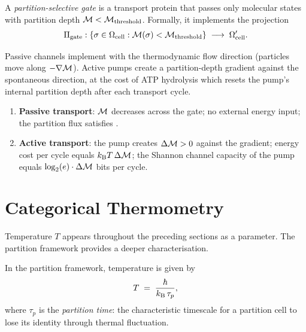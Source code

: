 \begin{definition}
\label{def:gate}
A \emph{partition-selective gate} is a transport protein that passes only
molecular states with partition depth $\mathcal{M} < \mathcal{M}_\mathrm{threshold}$.
Formally, it implements the projection
\[
    \Pi_\mathrm{gate}: \{\sigma \in \Omega_\mathrm{cell} : \mathcal{M}(\sigma) < \mathcal{M}_\mathrm{threshold}\}
    \;\longrightarrow\; \Omega_\mathrm{cell}'.
\]
\end{definition}

Passive channels implement  with the thermodynamic flow direction
(particles move along $-\nabla\mathcal{M}$).  Active pumps create a partition-depth
gradient against the spontaneous direction, at the cost of ATP hydrolysis which
resets the pump's internal partition depth after each transport cycle.

\begin{proposition}
\label{prop:transport-types}
\begin{enumerate}[label=(\roman*)]
    \item \textbf{Passive transport}: $\mathcal{M}$ decreases across the gate; no
          external energy input; the partition flux satisfies .
    \item \textbf{Active transport}: the pump creates $\Delta\mathcal{M} > 0$ against
          the gradient; energy cost per cycle equals $k_{\mathrm{B}} T\,\Delta\mathcal{M}$; the
          Shannon channel capacity of the pump equals $\log_2(e)\cdot\Delta\mathcal{M}$
          bits per cycle.
\end{enumerate}
\end{proposition}

\section{Categorical Thermometry}
\label{sec:thermometry}

Temperature $T$ appears throughout the preceding sections as a parameter.  The
partition framework provides a deeper characterisation.

\begin{theorem}
\label{thm:thermometry}
In the partition framework, temperature is given by
\begin{equation}
    T \;=\; \frac{\hbar}{k_{\mathrm{B}}\,\tau_p},
    \label{eq:temperature}
\end{equation}
where $\tau_p$ is the \emph{partition time}: the characteristic timescale for
a partition cell to lose its identity through thermal fluctuation.
\end{theorem}

